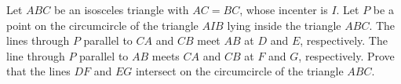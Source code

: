 Let $ABC$ be an isosceles triangle with $AC = BC$, whose incenter is $I$. Let $P$ be a point on the circumcircle of the triangle $AIB$ lying inside the triangle $ABC$. The lines through $P$ parallel to $CA$ and $CB$ meet $AB$ at $D$ and $E$, respectively. The line through $P$ parallel to $AB$ meets $CA$ and $CB$ at $F$ and $G$, respectively. Prove that the lines $DF$ and $EG$ intersect on the circumcircle of the triangle $ABC$.
